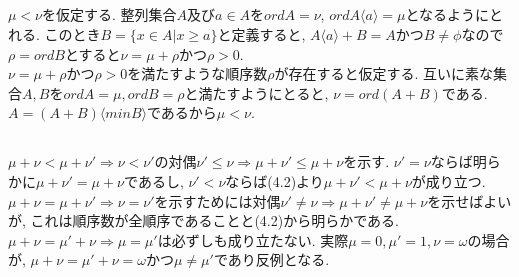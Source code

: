 \documentclass{jsarticle}
\begin{document}
\subsection{} %
$\mu < \nu$を仮定する. 整列集合$A$及び$a \in A$を$ord A = \nu$, $ord A\langle a\rangle = \mu$となるようにとれる. このとき$B = \{x \in A | x \ge a\}$と定義すると, $A\langle a \rangle  + B = A$かつ$B \neq \phi$なので$\rho = ord B$とすると$\nu = \mu + \rho$かつ$\rho > 0$.\\
$\nu = \mu + \rho$かつ$\rho > 0$を満たすような順序数$\rho$が存在すると仮定する. 互いに素な集合$A, B$を$ord A = \mu, ord B = \rho$と満たすようにとると, $\nu = ord (A + B)$である. $A = (A + B)\langle min B \rangle$であるから$\mu < \nu$.

\subsection{} %
$\mu + \nu < \mu + \nu' \Rightarrow \nu < \nu'$の対偶$\nu' \le \nu \Rightarrow \mu + \nu' \le \mu + \nu$を示す. $\nu' = \nu$ならば明らかに$\mu + \nu' = \mu + \nu$であるし, $\nu' < \nu$ならば(4.2)より$\mu + \nu' < \mu + \nu$が成り立つ.\\
$\mu + \nu = \mu + \nu' \Rightarrow \nu = \nu'$を示すためには対偶$\nu' \neq \nu \Rightarrow \mu + \nu' \neq \mu + \nu$を示せばよいが, これは順序数が全順序であることと(4.2)から明らかである.\\
$\mu + \nu = \mu' + \nu \Rightarrow \mu = \mu'$は必ずしも成り立たない. 実際$\mu = 0, \mu' = 1, \nu = \omega$の場合が, $\mu + \nu = \mu' + \nu = \omega$かつ$\mu \neq \mu'$であり反例となる.
\end{document}
